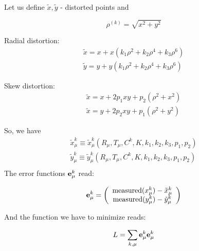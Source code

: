 \documentclass[a4paper,10pt]{article}
\begin{document}
Let us define $\tilde{x}, \tilde{y}$ - distorted points and

\begin{equation}
 \rho^{(k)} = \sqrt{x^2 + y^2}
\end{equation}

Radial distortion:
{
\begin{equation}
\begin{array}{c}
 \tilde{x} = x + x(k_1 \rho^2 + k_2 \rho^4 + k_3 \rho^6) \\
 \tilde{y} = y + y(k_1 \rho^2 + k_2 \rho^4 + k_3 \rho^6)
\end{array}
\end{equation}
}

Skew distortion:
{
\begin{equation}
 \begin{array}{c}
  \tilde{x} = x + 2 p_1 xy + p_2 \left(\rho^2 + x^2\right) \\
  \tilde{x} = y + 2 p_2 xy + p_1 \left(\rho^2 + y^2\right)
 \end{array}
\end{equation}
}

So, we have
{
\begin{equation}
\begin{array}{c}
 \tilde{x}^k_\mu\equiv \tilde{x}^k_\mu\left(R_\mu, T_\mu, C^k, K, k_1,k_2,k_3, p_1,p_2\right) \\
 \tilde{y}^k_\mu\equiv \tilde{y}^k_\mu\left(R_\mu, T_\mu, C^k, K, k_1,k_2,k_3, p_1,p_2\right) \\
\end{array} 
\end{equation}
}
The error functions ${\bf e}^k_\mu$ read:

{
\begin{equation}
 {\bf e}^k_\mu = \left(
 \begin{array}{c}
                  \operatorname{measured}(x^k_\mu) - \tilde{x}^k_\mu \\
                  \operatorname{measured}({y}^k_\mu) - \tilde{y}^k_\mu \\
                 \end{array}\right)
\end{equation}
}

And the function we have to minimize reads:

\begin{equation}
 L = \sum\limits_{k,\mu} {\bf e}^k_\mu {\bf e}^k_\mu
\end{equation}
\end{document}
